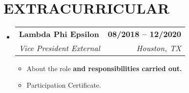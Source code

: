 \documentclass[letterpaper,11pt]{article}
\makeatletter
\newcommand{\resumeItem}[1]{
  \item\small{
    {#1 \vspace{-2pt}}
  }
}
\newcommand{\resumeSubheading}[4]{
  \vspace{-2pt}\item
    \begin{tabular*}{1.0\textwidth}[t]{l@{\extracolsep{\fill}}r}
      \textbf{\large#1} & \textbf{\small #2} \\
      \textit{\large#3} & \textit{\small #4} \\
      
    \end{tabular*}\vspace{-7pt}
}
\newcommand{\resumeSubHeadingListStart}{\begin{itemize}[leftmargin=0.0in, label={}]}
\newcommand{\resumeSubHeadingListEnd}{\end{itemize}}
\newcommand{\resumeItemListStart}{\begin{itemize}}
\newcommand{\resumeItemListEnd}{\end{itemize}\vspace{-5pt}}
\makeatother
\begin{document}
\section{EXTRACURRICULAR}
    \resumeSubHeadingListStart
        \resumeSubheading{Lambda Phi Epsilon}{08/2018 -- 12/2020 }{{Vice President External}}{Houston, TX}
            \resumeItemListStart
                \vspace{10pt}
                \resumeItem{\normalsize{About the role \textbf{and responsibilities carried out.}}}
                \vspace{5pt}
                \resumeItem{\normalsize{Participation Certificate.}}
            \resumeItemListEnd
    \resumeSubHeadingListEnd
 \vspace{-11pt}
 
\end{document}
